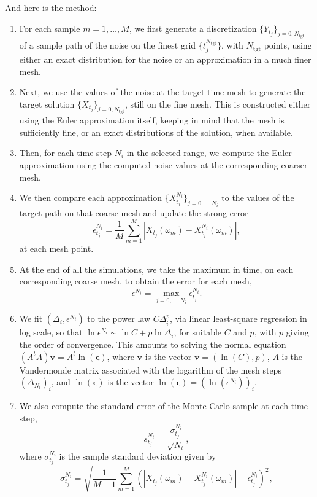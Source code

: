\documentclass[reqno,12pt]{amsart}
\theoremstyle{plain} %
\theoremstyle{definition} %
\begin{document}
And here is the method:
\begin{enumerate}
    \item For each sample $m=1, \ldots, M$, we first generate a discretization $\{Y_{t_j}\}_{j=0, N_{\mathrm{tgt}}}$ of a sample path of the noise on the finest grid $\{t_j^{N_{\mathrm{tgt}}}\}$, with $N_{\mathrm{tgt}}$ points, using either an exact distribution for the noise or an approximation in a much finer mesh.
    \item Next, we use the values of the noise at the target time mesh to generate the target solution $\{X_{t_j}\}_{j=0, N_{\mathrm{tgt}}}$, still on the fine mesh. This is constructed either using the Euler approximation itself, keeping in mind that the mesh is sufficiently fine, or an exact distributions of the solution, when available.
    \item Then, for each time step $N_i$ in the selected range, we compute the Euler approximation using the computed noise values at the corresponding coarser mesh.
    \item We then compare each approximation $\{X_{t_j}^{N_i}\}_{j=0, \ldots, N_i}$ to the values of the target path on that coarse mesh and update the strong error
    \[
        \epsilon_{t_j}^{N_i} = \frac{1}{M}\sum_{m=1}^M \left|X_{t_j}(\omega_m) - X_{t_j}^{N_i}(\omega_m)\right|,
    \]
    at each mesh point.
    \item At the end of all the simulations, we take the maximum in time, on each corresponding coarse mesh, to obtain the error for each mesh,
    \[
        \epsilon^{N_i} = \max_{j=0, \ldots, N_i} \epsilon_{t_j}^{N_i}.
    \]
    \item We fit $(\Delta_i, \epsilon^{N_i})$ to the power law $C\Delta_i^p$, via linear least-square regression in log scale, so that $\ln \epsilon^{N_i} \sim \ln C + p \ln \Delta_i$, for suitable $C$ and $p$, with $p$ giving the order of convergence. This amounts to solving the normal equation $(A^tA)\mathbf{v} = A^t\ln(\boldsymbol{\epsilon})$, where $\mathbf{v}$ is the vector $\mathbf{v} = (\ln(C), p)$, $A$ is the Vandermonde matrix associated with the logarithm of the mesh steps $(\Delta_{N_i})_i$, and $\ln(\boldsymbol{\epsilon})$ is the vector $\ln(\boldsymbol{\epsilon}) = (\ln(\epsilon^{N_i}))_i$.
    \item We also compute the standard error of the Monte-Carlo sample at each time step,
    \[
        s_{t_j}^{N_i} = \frac{\sigma_{t_j}^{N_i}}{\sqrt{N_i}},
    \]
    where $\sigma_{t_j}^{N_i}$ is the sample standard deviation given by
    \[
        \sigma_{t_j}^{N_i} = \sqrt{\frac{1}{M-1}\sum_{m=1}^M \left(\left|X_{t_j}(\omega_m) - X_{t_j}^{N_i}(\omega_m) \right|- \epsilon_{t_j}^{N_i}\right)^2},
\]
\end{enumerate}
\end{document}

